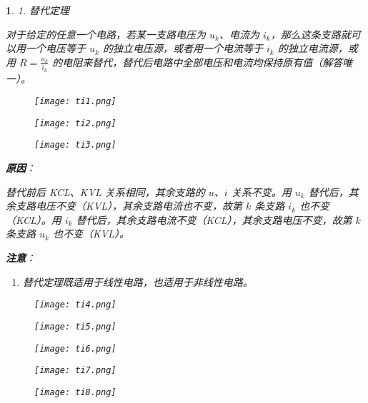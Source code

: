 \documentclass[UTF8]{report}
\theoremstyle{MyLineTheoremStyle} %
\theoremstyle{MyBlockTheoremStyle} %
\theoremstyle{MySubsubsectionStyle} %
\newtheorem{definition}{}
\begin{document}
\begin{definition}
    1. 替代定理

    对于给定的任意一个电路，若某一支路电压为 $u_k$、电流为 $i_k$，那么这条支路就可以用一个电压等于 $u_k$ 的独立电压源，或者用一个电流等于 $i_k$ 的独立电流源，或用 $R = \frac{u_k}{i_k}$ 的电阻来替代，替代后电路中全部电压和电流均保持原有值（解答唯一）。

    \begin{figure}[H]
        \centering
        \texttt{[image: ti1.png]}
    \end{figure}

    \begin{figure}[H]
        \centering
        \texttt{[image: ti2.png]}
    \end{figure}

    \begin{figure}[H]
        \centering
        \texttt{[image: ti3.png]}
    \end{figure}

    \textbf{原因}：\par
    替代前后 KCL、KVL 关系相同，其余支路的 $u$、$i$ 关系不变。用 $u_k$ 替代后，其余支路电压不变（KVL），其余支路电流也不变，故第 $k$ 条支路 $i_k$ 也不变（KCL）。用 $i_k$ 替代后，其余支路电流不变（KCL），其余支路电压不变，故第 $k$ 条支路 $u_k$ 也不变（KVL）。

    \textbf{注意}：
    \begin{enumerate}
        \item 替代定理既适用于线性电路，也适用于非线性电路。
    \end{enumerate}

    \begin{figure}[H]
        \centering
        \texttt{[image: ti4.png]}
    \end{figure}

    \begin{figure}[H]
        \centering
        \texttt{[image: ti5.png]}
    \end{figure}

    \begin{figure}[H]
        \centering
        \texttt{[image: ti6.png]}
    \end{figure}

    \begin{figure}[H]
        \centering
        \texttt{[image: ti7.png]}
    \end{figure}

    \begin{figure}[H]
        \centering
        \texttt{[image: ti8.png]}
    \end{figure}
\end{definition}
\end{document}
